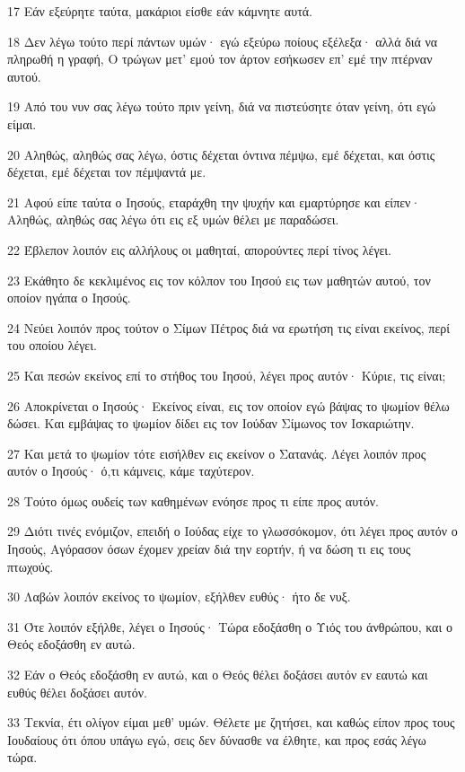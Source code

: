 \par 17 Εάν εξεύρητε ταύτα, μακάριοι είσθε εάν κάμνητε αυτά.
\par 18 Δεν λέγω τούτο περί πάντων υμών· εγώ εξεύρω ποίους εξέλεξα· αλλά διά να πληρωθή η γραφή, Ο τρώγων μετ' εμού τον άρτον εσήκωσεν επ' εμέ την πτέρναν αυτού.
\par 19 Από του νυν σας λέγω τούτο πριν γείνη, διά να πιστεύσητε όταν γείνη, ότι εγώ είμαι.
\par 20 Αληθώς, αληθώς σας λέγω, όστις δέχεται όντινα πέμψω, εμέ δέχεται, και όστις δέχεται, εμέ δέχεται τον πέμψαντά με.
\par 21 Αφού είπε ταύτα ο Ιησούς, εταράχθη την ψυχήν και εμαρτύρησε και είπεν· Αληθώς, αληθώς σας λέγω ότι εις εξ υμών θέλει με παραδώσει.
\par 22 Έβλεπον λοιπόν εις αλλήλους οι μαθηταί, απορούντες περί τίνος λέγει.
\par 23 Εκάθητο δε κεκλιμένος εις τον κόλπον του Ιησού εις των μαθητών αυτού, τον οποίον ηγάπα ο Ιησούς.
\par 24 Νεύει λοιπόν προς τούτον ο Σίμων Πέτρος διά να ερωτήση τις είναι εκείνος, περί του οποίου λέγει.
\par 25 Και πεσών εκείνος επί το στήθος του Ιησού, λέγει προς αυτόν· Κύριε, τις είναι;
\par 26 Αποκρίνεται ο Ιησούς· Εκείνος είναι, εις τον οποίον εγώ βάψας το ψωμίον θέλω δώσει. Και εμβάψας το ψωμίον δίδει εις τον Ιούδαν Σίμωνος τον Ισκαριώτην.
\par 27 Και μετά το ψωμίον τότε εισήλθεν εις εκείνον ο Σατανάς. Λέγει λοιπόν προς αυτόν ο Ιησούς· ό,τι κάμνεις, κάμε ταχύτερον.
\par 28 Τούτο όμως ουδείς των καθημένων ενόησε προς τι είπε προς αυτόν.
\par 29 Διότι τινές ενόμιζον, επειδή ο Ιούδας είχε το γλωσσόκομον, ότι λέγει προς αυτόν ο Ιησούς, Αγόρασον όσων έχομεν χρείαν διά την εορτήν, ή να δώση τι εις τους πτωχούς.
\par 30 Λαβών λοιπόν εκείνος το ψωμίον, εξήλθεν ευθύς· ήτο δε νυξ.
\par 31 Ότε λοιπόν εξήλθε, λέγει ο Ιησούς· Τώρα εδοξάσθη ο Υιός του άνθρώπου, και ο Θεός εδοξάσθη εν αυτώ.
\par 32 Εάν ο Θεός εδοξάσθη εν αυτώ, και ο Θεός θέλει δοξάσει αυτόν εν εαυτώ και ευθύς θέλει δοξάσει αυτόν.
\par 33 Τεκνία, έτι ολίγον είμαι μεθ' υμών. Θέλετε με ζητήσει, και καθώς είπον προς τους Ιουδαίους ότι όπου υπάγω εγώ, σεις δεν δύνασθε να έλθητε, και προς εσάς λέγω τώρα.
